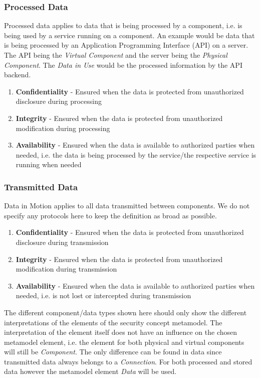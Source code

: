 \subsubsection*{Processed Data}

Processed data applies to data that is being processed by a component, i.e. is being used by a service running on a component. An example would be data that is being processed by an Application Programming Interface (API) on a server. The API being the \textit{Virtual Component} and the server being the \textit{Physical Component}. The \textit{Data in Use} would be the processed information by the API backend.

\begin{enumerate}
\item \textbf{Confidentiality} - Ensured when the data is protected from unauthorized disclosure during processing
\item \textbf{Integrity} - Ensured when the data is protected from unauthorized modification during processing
\item \textbf{Availability} - Ensured when the data is available to authorized parties when needed, i.e. the data is being processed by the service/the respective service is running when needed
\end{enumerate}


\subsubsection*{Transmitted Data}

Data in Motion applies to all data transmitted between components. We do not specify any protocols here to keep the definition as broad as possible.

\begin{enumerate}
\item \textbf{Confidentiality} - Ensured when the data is protected from unauthorized disclosure during transmission
\item \textbf{Integrity} - Ensured when the data is protected from unauthorized modification during transmission
\item \textbf{Availability} - Ensured when the data is available to authorized parties when needed, i.e. is not lost or intercepted during transmission 
\end{enumerate}

The different component/data types shown here should only show the different interpretations of the elements of the security concept metamodel. The interpretation of the element itself does not have an influence on the chosen metamodel element, i.e. the element for both physical and virtual components will still be \textit{Component}. The only difference can be found in data since transmitted data always belongs to a \textit{Connection}. For both processed and stored data however the metamodel element \textit{Data} will be used.

